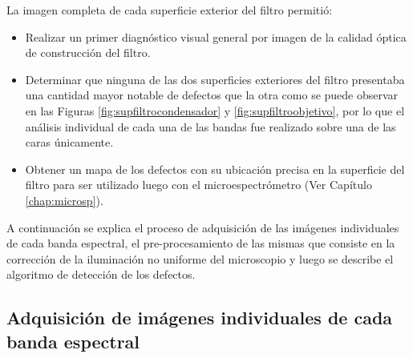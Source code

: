 La imagen completa de cada superficie exterior del filtro permitió:
\begin{itemize}
	\item Realizar un primer diagnóstico visual general por imagen de la calidad óptica de construcción del filtro. 
	\item Determinar que ninguna de las dos superficies exteriores del filtro presentaba una cantidad mayor notable de defectos que la otra como se puede observar en las Figuras \ref{fig:supfiltrocondensador} y \ref{fig:supfiltroobjetivo}, por lo que el análisis individual de cada una de las bandas fue realizado sobre una de las caras únicamente.
	\item Obtener un mapa de los defectos con su ubicación precisa en la superficie del filtro para ser utilizado luego con el microespectrómetro (Ver Capítulo \ref{chap:microsp}).
\end{itemize}

A continuación se explica el proceso de adquisición de las imágenes individuales de cada banda espectral, el pre-procesamiento de las mismas que consiste en la corrección de la iluminación no uniforme del microscopio y luego se describe el algoritmo de detección de los defectos.

\singlespacing
\subsection{Adquisición de imágenes individuales de cada banda espectral}
\label{sec:cadab}

